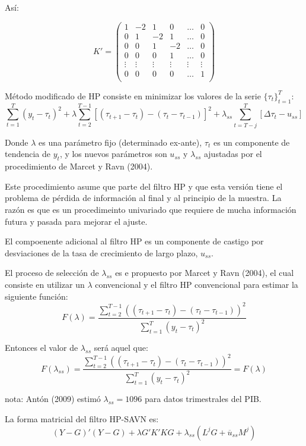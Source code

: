 \documentclass[
]{book}
\begin{document}
Así:

\[K' =
\begin{pmatrix}
1 & -2 & 1 & 0 & \ldots & 0 \\
0 & 1 & -2 & 1 & \ldots & 0 \\
0 & 0 & 1 & -2 & \ldots & 0 \\
0 & 0 & 0 & 1 & \ldots & 0 \\
\vdots & \vdots &  \vdots &  \vdots &  \vdots &  \vdots \\
0 & 0 & 0 & 0 & \ldots & 1 \\
\end{pmatrix}
\]

Método modificado de HP consiste en minimizar los valores de la serie \(\{ \tau_t \}_{t=1}^T\):
\[\sum_{t=1}^T (y_t - \tau_t)^2 + \lambda \sum_{t=2}^{T-1} [(\tau_{t+1} - \tau_t) - (\tau_t - \tau_{t-1})]^2 + \lambda_{ss} \sum_{t=T-j}^{T} [\Delta \tau_t - u_{ss}]\]

Donde \(\lambda\) es una parámetro fijo (determinado ex-ante), \(\tau_t\) es un componente de tendencia de \(y_t\), y los nuevos parámetros son \(u_{ss}\) y \(\lambda_{ss}\) ajustadas por el procedimiento de Marcet y Ravn (2004).

Este procedimiento asume que parte del filtro HP y que esta versión tiene el problema de pérdida de información al final y al principio de la muestra. La razón es que es un procedimeinto univariado que requiere de mucha información futura y pasada para mejorar el ajuste.

El compoenente adicional al filtro HP es un componente de castigo por desviaciones de la tasa de crecimiento de largo plazo, \(u_{ss}\).

El proceso de selección de \(\lambda_{ss}\) es e propuesto por Marcet y Ravn (2004), el cual consiste en utilizar un \(\lambda\) convencional y el filtro HP convencional para estimar la siguiente función:
\[F(\lambda) = \frac{\sum_{t=2}^{T-1} ((\tau_{t+1} - \tau_t) - (\tau_t - \tau_{t-1}))^2}{\sum_{t=1}^T (y_t - \tau_t)^2}\]

Entonces el valor de \(\lambda_{ss}\) será aquel que:
\[F(\lambda_{ss}) = \frac{\sum_{t=2}^{T-1} ((\tau_{t+1} - \tau_t) - (\tau_t - \tau_{t-1}))^2}{\sum_{t=1}^T (y_t - \tau_t)^2} = F(\lambda)\]

nota: Antón (2009) estimó \(\lambda_{ss} = 1096\) para datos trimestrales del PIB.

La forma matricial del filtro HP-SAVN es:
\[(Y - G)'(Y - G) + \lambda G' K' K G + \lambda_{ss} (L^j G + \overline{u}_{ss} M^j)\]
\end{document}
